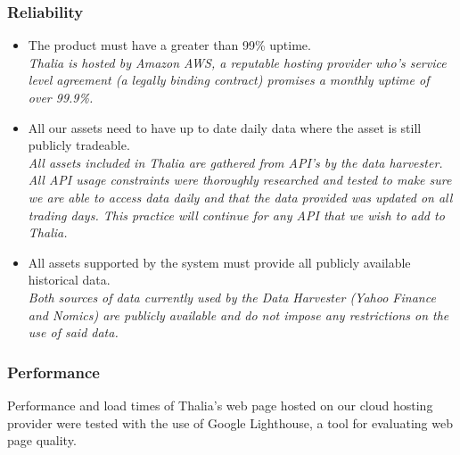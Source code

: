 \documentclass[main.tex]{subfiles}
\begin{document}
\subsubsection{Reliability}
\begin{itemize}

\item The product must have a greater than 99\% uptime.\\
\textit{Thalia is hosted by Amazon AWS, a reputable hosting provider who’s service level agreement (a legally binding contract) promises a monthly uptime of over 99.9\%\cite{amazonSLA}.}

\item All our assets need to have up to date daily data where the asset is still publicly tradeable.\\
\textit{All assets included in Thalia are gathered from API’s by the data harvester. All API usage constraints were thoroughly researched and tested to make sure we are able to access data daily and that the data provided was updated on all trading days. This practice will continue for any API that we wish to add to Thalia.}

\item All assets supported by the system must provide all publicly available historical data.\\
\textit{Both sources of data currently used by the Data Harvester (Yahoo Finance and Nomics) are publicly available and do not impose any restrictions on the use of said data.}

\end{itemize}

\subsubsection{Performance}
Performance and load times of Thalia's web page hosted on our cloud hosting provider were tested with the use of Google Lighthouse, a tool for evaluating web page quality.
\end{document}

